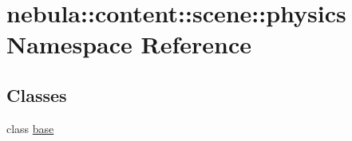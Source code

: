 \hypertarget{namespacenebula_1_1content_1_1scene_1_1physics}{
\section{nebula::content::scene::physics Namespace Reference}
\label{namespacenebula_1_1content_1_1scene_1_1physics}
}
\subsection*{Classes}
\begin{DoxyCompactItemize}
\item 
class \hyperlink{classnebula_1_1content_1_1scene_1_1physics_1_1base}{base}
\end{DoxyCompactItemize}
